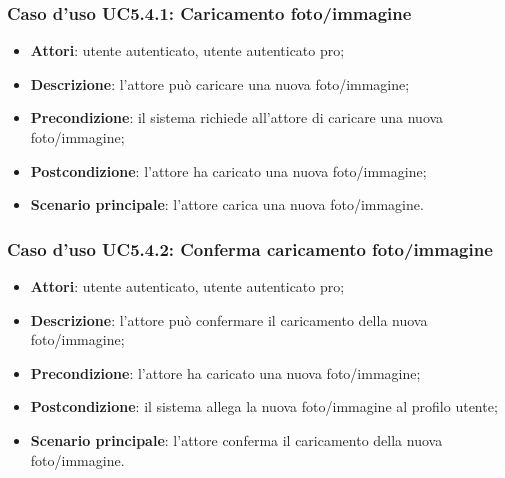 \subsubsection{Caso d'uso UC5.4.1: Caricamento foto/immagine}

\begin{itemize}
	\item \textbf{Attori}: utente autenticato, utente autenticato pro;
	\item \textbf{Descrizione}: l'attore può caricare una nuova foto/immagine;
	\item \textbf{Precondizione}: il sistema richiede all'attore di caricare una nuova foto/immagine;
	\item \textbf{Postcondizione}: l'attore ha caricato una nuova foto/immagine;
	\item \textbf{Scenario principale}: l'attore carica una nuova foto/immagine.
\end{itemize}

\subsubsection{Caso d'uso UC5.4.2: Conferma caricamento foto/immagine}

\begin{itemize}
	\item \textbf{Attori}: utente autenticato, utente autenticato pro;
	\item \textbf{Descrizione}: l'attore può confermare il caricamento della nuova foto/immagine;
	\item \textbf{Precondizione}: l'attore ha caricato una nuova foto/immagine;
	\item \textbf{Postcondizione}: il sistema allega la nuova foto/immagine al profilo utente;
	\item \textbf{Scenario principale}: l'attore conferma il caricamento della nuova foto/immagine.
\end{itemize}


